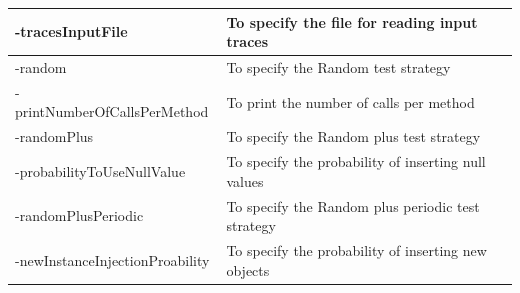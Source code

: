 \begin{center}
\begin{table}[H]
{{\begin{tabular}{|l|l|}
-tracesInputFile					&To specify the file for reading input traces 					\\ \hline
-random						&To specify the Random test strategy					\\ \hline
-printNumberOfCallsPerMethod		&To print the number of calls per method			\\ \hline
-randomPlus						&To specify the Random plus test strategy				\\ \hline
-probabilityToUseNullValue		&To specify the probability of inserting null values		\\ \hline
-randomPlusPeriodic				&To specify the Random plus periodic test strategy		\\ \hline
-newInstanceInjectionProability	&To specify the probability of inserting new objects		\\ \hline

\hline %
\end{tabular}
}}
\bigskip
\label{table:cliOptions} %
\end{table}
\end{center}

